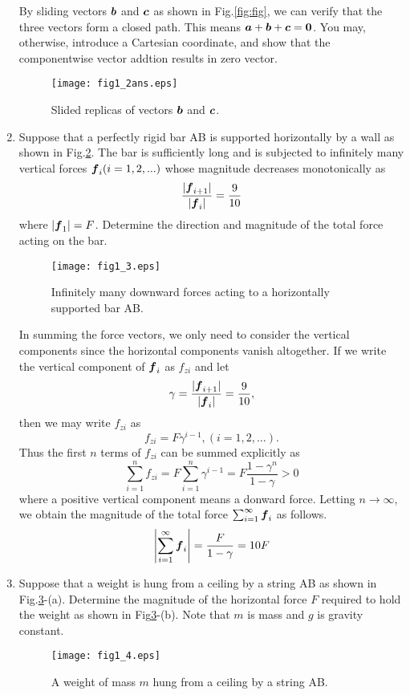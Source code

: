 \documentclass[10pt,a4j]{article}
\begin{document}
\begin{enumerate}
	{\small
		By sliding vectors $\mbox{\boldmath $b$}$ and $\mbox{\boldmath $c$}$ as shown in Fig.\ref{fig:fig}, 
		we can verify that the three vectors form a closed path. 
		This means $\mbox{\boldmath $a$}+\mbox{\boldmath $b$}+\mbox{\boldmath $c$}=\mbox{\boldmath $0$}$. 
		You may, otherwise, introduce a Cartesian coordinate, and show that the componentwise vector addtion results in zero vector. 
	}
	\begin{figure}[h]
		\begin{center}
		\texttt{[image: fig1\_2ans.eps]} 
		\end{center}
		\caption{Slided replicas of vectors $\mbox{\boldmath $b$}$ and $\mbox{\boldmath $c$}$.} 
		\label{fig:fig1_2ans}
	\end{figure}
\item
	Suppose that a perfectly rigid bar AB is supported horizontally by a wall
	as shown in Fig.\ref{fig:fig1_3}. The bar is sufficiently long and is 
	subjected to infinitely many vertical forces $\mbox{\boldmath $f$}_i (i=1,2,...)$ 
	whose magnitude decreases monotonically as 
	\[
	 	\frac{ |\mbox{\boldmath $f$}_{i+1}| }{ |\mbox{\boldmath $f$}_i| } =\frac{9}{10} 
	\]
	where $|\mbox{\boldmath $f$}_1|=F$. Determine the direction and magnitude of the total 
	force acting on the bar.\\
\begin{figure}[h]
	\begin{center}
	\texttt{[image: fig1\_3.eps]} 
	\end{center}
	\caption{Infinitely many downward forces acting to a horizontally supported bar AB.}
	\label{fig:fig1_3}
\end{figure}

	{\small 
		In summing the force vectors, we only need to consider the vertical components since 
		the horizontal components vanish altogether. If we write the vertical component of $\mbox{\boldmath $f$}_i$ 
		as $f_{zi}$ and let 
		\[
			\gamma=\frac{|\mbox{\boldmath $f$}_{i+1}|}{|\mbox{\boldmath $f$}_i|}=\frac{9}{10},
		\]
		then we may write $f_{zi}$ as 
		\[
			f_{zi}=F\gamma^{i-1}, (i=1,2,\dots).
		\]
		Thus the first $n$ terms of $f_{zi}$ can be summed explicitly as  
		\[
			\sum_{i=1}^n f_{zi}=F\sum_{i=1}^n\gamma^{i-1}=F\frac{1-\gamma^n}{1-\gamma} >0
		\]
		where a positive vertical component means a donward force.
		Letting $n\rightarrow \infty$, we obtain the magnitude of the total force $\sum_{i=1}^\infty \mbox{\boldmath $f$}_i$ 
		as follows. 
		\[
			\left| \sum_{i=1}^\infty \mbox{\boldmath $f$}_i \right| =\frac{F}{1-\gamma}=10F
		\]
	}
\item
	Suppose that a weight is hung from a ceiling by a string AB as shown in Fig.\ref{fig:fig1_4}-(a). 
	Determine the magnitude of the horizontal force $F$ required to hold the weight as 
	shown in Fig\ref{fig:fig1_4}-(b).  Note that $m$ is mass and $g$ is gravity constant. \\
	\begin{figure}[h]
	\begin{center}
	\texttt{[image: fig1\_4.eps]} 
	\end{center}
	\caption{A weight of mass $m$ hung from a ceiling by a string AB.} 
	\label{fig:fig1_4}
	\end{figure}


\end{enumerate}
\end{document}
